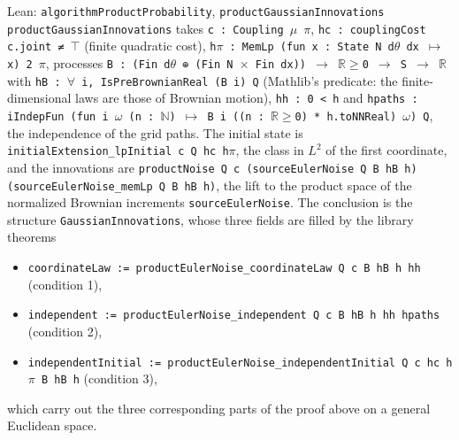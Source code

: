 \documentclass[11pt,a4paper]{article}
\begin{document}
\begin{leanbox}{Lean: \texttt{algorithmProductProbability}, \texttt{productGaussianInnovations}}
\texttt{product\allowbreak{}Gaussian\allowbreak{}Innovations} takes \texttt{c : Coupling \ensuremath{\mu} \ensuremath{\pi}}, \texttt{hc : coupling\allowbreak{}Cost c.\allowbreak{}joint ≠ \ensuremath{\top}} (finite quadratic cost), \texttt{h\ensuremath{\pi} : Mem\allowbreak{}Lp (fun x : State N d\ensuremath{\theta} dx \ensuremath{\mapsto} x) 2 \ensuremath{\pi}}, processes \texttt{B : (Fin d\ensuremath{\theta} ⊕ (Fin N \ensuremath{\times} Fin dx)) \ensuremath{\to} \ensuremath{\mathbb R}\ensuremath{\ge}0 \ensuremath{\to} S \ensuremath{\to} \ensuremath{\mathbb R}} with \texttt{h\allowbreak{}B : \ensuremath{\forall} i, Is\allowbreak{}Pre\allowbreak{}Brownian\allowbreak{}Real (B i) Q} (Mathlib's predicate: the finite-dimensional laws are those of Brownian motion), \texttt{hh : 0 < h} and \texttt{hpaths : i\allowbreak{}Indep\allowbreak{}Fun (fun i \ensuremath{\omega} (n : \ensuremath{\mathbb N}) \ensuremath{\mapsto} B i ((n : \ensuremath{\mathbb R}\ensuremath{\ge}0) * h.\allowbreak{}to\allowbreak{}NNReal) \ensuremath{\omega}) Q}, the independence of the grid paths. The initial state is \texttt{initial\allowbreak{}Extension\_\allowbreak{}lp\allowbreak{}Initial c Q hc h\ensuremath{\pi}}, the class in \(L^2\) of the first coordinate, and the innovations are \texttt{product\allowbreak{}Noise Q c (source\allowbreak{}Euler\allowbreak{}Noise Q B h\allowbreak{}B h) (source\allowbreak{}Euler\allowbreak{}Noise\_\allowbreak{}mem\allowbreak{}Lp Q B h\allowbreak{}B h)}, the lift to the product space of the normalized Brownian increments \texttt{source\allowbreak{}Euler\allowbreak{}Noise}. The conclusion is the structure \texttt{Gaussian\allowbreak{}Innovations}, whose three fields are filled by the library theorems



\begin{itemize}


\item \texttt{coordinate\allowbreak{}Law := product\allowbreak{}Euler\allowbreak{}Noise\_\allowbreak{}coordinate\allowbreak{}Law Q c B h\allowbreak{}B h hh} (condition 1),

\item \texttt{independent := product\allowbreak{}Euler\allowbreak{}Noise\_\allowbreak{}independent Q c B h\allowbreak{}B h hh hpaths} (condition 2),

\item \texttt{independent\allowbreak{}Initial := product\allowbreak{}Euler\allowbreak{}Noise\_\allowbreak{}independent\allowbreak{}Initial Q c hc h\ensuremath{\pi} B h\allowbreak{}B h} (condition 3),

\end{itemize}



which carry out the three corresponding parts of the proof above on a general Euclidean space.
\end{leanbox}
\end{document}
